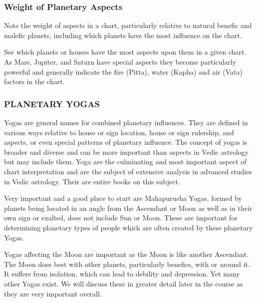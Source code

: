  

\subsubsection{Weight of Planetary Aspects}

Note the weight of aspects in a chart, particularly relative to natural benefic and malefic planets, including which planets have the most influence on the chart.

See which planets or houses have the most aspects upon them in a given chart. As Mars, Jupiter, and Saturn have special aspects they become particularly powerful and generally indicate the fire (Pitta), water (Kapha) and air (Vata) factors in the chart.

 

\subsubsection{PLANETARY YOGAS}
 

Yogas are general names for combined planetary influences. They are defined in various ways relative to house or sign location, house or sign rulership, and aspects, or even special patterns of planetary influence. The concept of yogas is broader and diverse and can be more important than aspects in Vedic astrology but may include them. Yoga are the culminating and most important aspect of chart interpretation and are the subject of extensive analysis in advanced studies in Vedic astrology. Their are entire books on this subject.

 

Very important and a good place to start are Mahapurusha Yogas, formed by planets being located in an angle from the Ascendant or Moon as well as in their own sign or exalted, does not include Sun or Moon. These are important for determining planetary types of people which are often created by these planetary Yogas.

 

Yogas affecting the Moon are important as the Moon is like another Ascendant. The Moon does best with other planets, particularly benefics, with or around it. It suffers from isolation, which can lead to debility and depression. Yet many other Yogas exist. We will discuss these in greater detail later in the course as they are very important overall.